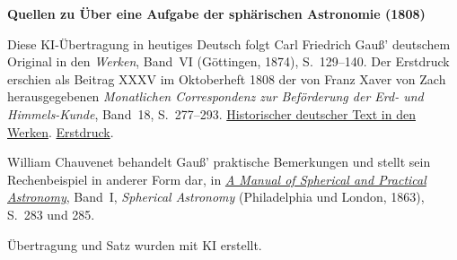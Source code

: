 \clearpage\thispagestyle{empty}
\begin{center}\textbf{Quellen zu Über eine Aufgabe der sphärischen Astronomie (1808)}\end{center}
\noindent Diese KI-Übertragung in heutiges Deutsch folgt Carl Friedrich Gauß’ deutschem Original in den \textit{Werken}, Band~VI (Göttingen, 1874), S.~129--140. Der Erstdruck erschien als Beitrag XXXV im Oktoberheft 1808 der von Franz Xaver von Zach herausgegebenen \textit{Monatlichen Correspondenz zur Beförderung der Erd- und Himmels-Kunde}, Band~18, S.~277--293. \href{https://gdz.sub.uni-goettingen.de/id/PPN236007467}{Historischer deutscher Text in den Werken}. \href{https://www.digitale-sammlungen.de/en/view/bsb10538609?page=299}{Erstdruck}.
\par\smallskip\noindent William Chauvenet behandelt Gauß’ praktische Bemerkungen und stellt sein Rechenbeispiel in anderer Form dar, in \href{https://archive.org/details/amanualspherica06chaugoog/page/n291/mode/1up}{\textit{A Manual of Spherical and Practical Astronomy}}, Band~I, \textit{Spherical Astronomy} (Philadelphia und London, 1863), S.~283 und 285.
\par\smallskip\noindent Übertragung und Satz wurden mit KI erstellt.
\clearpage
